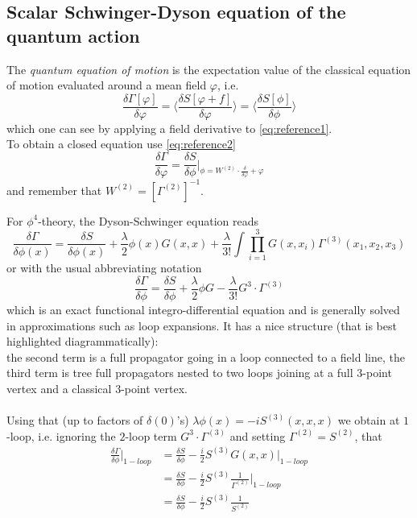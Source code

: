 \subsection{Scalar Schwinger-Dyson equation of the quantum action}
\begin{mybox}{}
	The \emph{quantum equation of motion} is the expectation value of the classical equation of motion evaluated around a mean field $\varphi$, i.e.
	\begin{equation}
		\frac{\delta \Gamma[\varphi]}{\delta \varphi} = \langle \frac{\delta S[\varphi+f]}{\delta \varphi} \rangle = \langle \frac{\delta S[\phi]}{\delta \phi} \rangle
	\end{equation}
	which one can see by applying a field derivative to \ref{eq:reference1}.\\
	To obtain a closed equation use \ref{eq:reference2}
	\begin{equation}
		\frac{\delta \Gamma}{\delta \varphi} = \frac{\delta S}{\delta \phi}|_{\phi=W^{(2)} \cdot \frac{\delta}{\delta \varphi} + \varphi}
	\end{equation}
	and remember that $W^{(2)}= [\Gamma^{(2)}]^{-1}$.
\end{mybox}
For $\phi^4$-theory, the Dyson-Schwinger equation reads
\begin{equation}
	\frac{\delta \Gamma}{\delta \phi(x)} = \frac{\delta S}{\delta \phi(x)} + \frac{\lambda}{2}\phi(x) G(x,x) + \frac{\lambda}{3!}\int \prod_{i=1}^{3}G(x,x_i) \Gamma^{(3)}(x_1,x_2,x_3)
\end{equation}
or with the usual abbreviating notation
\begin{equation}
	\frac{\delta \Gamma}{\delta \phi} = \frac{\delta S}{\delta \phi} + \frac{\lambda}{2} \phi G - \frac{\lambda}{3!}G^3\cdot \Gamma^{(3)}
\end{equation}
which is an exact functional integro-differential equation and is generally solved in approximations such as loop expansions. It has a nice structure (that is best highlighted diagrammatically):\\
the second term is a full propagator going in a loop connected to a field line, the third term is tree full propagators nested to two loops joining at a full $3$-point vertex and a classical $3$-point vertex.\\
\\
Using that (up to factors of $\delta(0)$'s) $\lambda \phi(x) = -i S^{(3)}(x,x,x)$ we obtain at $1$-loop, i.e. ignoring the $2$-loop term $G^3\cdot \Gamma^{(3)}$ and setting $\Gamma^{(2)}=S^{(2)}$, that
\begin{align*}
	\frac{\delta \Gamma}{\delta \phi} |_{1-loop} &= \frac{\delta S}{\delta \phi} - \frac{i}{2} S^{(3)} G(x,x)|_{1-loop} \\
	&= \frac{\delta S}{\delta \phi} - \frac{i}{2} S^{(3)} \frac{1}{\Gamma^{(2)}} |_{1-loop} \\
	&= \frac{\delta S}{\delta \phi} - \frac{i}{2} S^{(3)} \frac{1}{S^{(2)}}
\end{align*}
